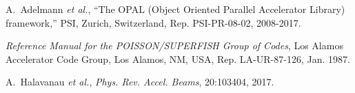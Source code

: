 \documentclass[letterpaper,  %
              ]{jacow-2_3}   %
\begin{document}
\begin{thebibliography}{99}
A.~Adelmann \emph{et al.},
“The OPAL (Object Oriented Parallel Accelerator Library) framework,”
PSI, Zurich, Switzerland,
Rep. PSI-PR-08-02, 2008-2017.

\emph{Reference Manual for the POISSON/SUPERFISH Group of 
	Codes},  Los Alamos Accelerator Code Group,  
Los Alamos, NM, USA, 
Rep. LA-UR-87-126, Jan. 1987.

A.~Halavanau \textit{et al.},
\emph{Phys. Rev. Accel. Beams}, 20:103404, 2017.


\end{thebibliography}



\null  %
\end{document}
